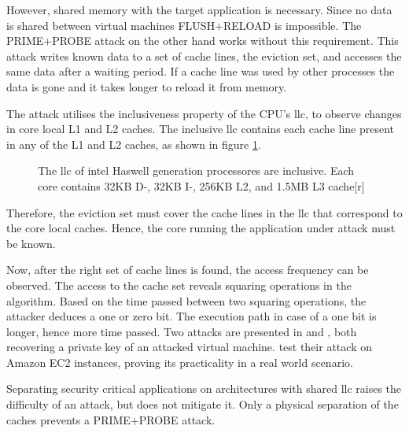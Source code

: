 However, shared memory with the target application is necessary.
Since no data is shared between virtual machines FLUSH+RELOAD is impossible.
The PRIME+PROBE attack on the other hand works without this requirement.
This attack writes known data to a set of cache lines, the eviction set,
and accesses the same data after a waiting period.
If a cache line was used by other processes the data is gone and it takes
longer to reload it from memory.

The attack utilises the inclusiveness property of the CPU's \gls{llc}, to observe
changes in core local L1 and L2 caches.
The inclusive \gls{llc} contains each cache line present in any of the L1 and
L2 caches, as shown in figure \ref{state:fig:inclusive}.
%
\begin{figure}[h]
  \setcapindent*{1em}
  \setlength{\columnsep}{10mm}
  \begin{captionbeside}{The \gls{llc} of \gls{intel} Haswell generation
    processores are inclusive.
   Each core contains 32KB D-, 32KB I-, 256KB L2, and 1.5MB L3 cache}[r]%
  
  \end{captionbeside}
  \label{state:fig:inclusive}
\end{figure}

Therefore, the eviction set must cover the cache lines in the \gls{llc} that
correspond to the core local caches.
Hence, the core running the application under attack must be known.

Now, after the right set of cache lines is found, the access frequency can be
observed.
The access to the cache set reveals squaring operations in the algorithm.
Based on the time passed between two squaring operations, the attacker deduces
a one or zero bit.
The execution path in case of a one bit is longer, hence more time passed.
Two attacks are presented in \cite{liu_last-level_2015} and
\cite{inci_seriously_2015}, both recovering a private key of an attacked
virtual machine.
\citeauthor{inci_seriously_2015} test their attack on Amazon EC2 instances,
proving its practicality in a real world scenario.

Separating security critical applications on architectures with shared
\gls{llc} raises the difficulty of an attack, but does not mitigate it.
Only a physical separation of the caches prevents a PRIME+PROBE attack.




